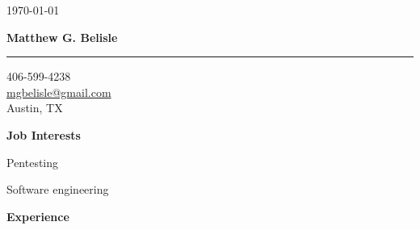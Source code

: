 \documentclass[10pt, a4paper]{article}
\begin{document}
\thispagestyle{empty}
\begin{flushright}
\small \today
\end{flushright}
\begin{center}
\textbf{\Large Matthew G. Belisle}
\rule{\linewidth}{0.5mm}
\end{center}
\begin{flushright}
\begin{minipage}[h]{0.25\linewidth}\small
\begin{flushleft}
406-599-4238\\
\href{mailto:mgbelisle@gmail.com}{mgbelisle@gmail.com}\\
Austin, TX
\end{flushleft}
\end{minipage}
\end{flushright}
\textbf{Job Interests}
\begin{itemize*}
  \item Pentesting
  \item Software engineering
\end{itemize*}
\textbf{Experience}
\end{document}
